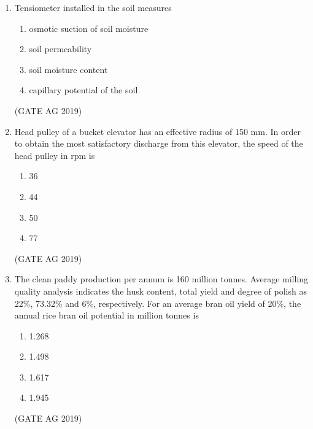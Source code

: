 \documentclass[journal,12pt,onecolumn]{IEEEtran}
\theoremstyle{remark}
\begin{document}
\begin{enumerate}
\begin{multicols}{4}
\begin{enumerate}
    \item 1-P, 2-R, 3-S, 4-Q
    \item 1-S, 2-P, 3-Q, 4-R
    \item 1-Q, 2-S, 3-P, 4-R
    \item 1-S, 2-Q, 3-P, 4-R
\end{enumerate}
\end{multicols}
\hfill{(GATE AG 2019)}


\item  Tensiometer installed in the soil measures

\begin{enumerate}
    \item osmotic suction of soil moisture
    \item soil permeability
    \item soil moisture content
    \item capillary potential of the soil
\end{enumerate}
\hfill{(GATE AG 2019)}



\item  Head pulley of a bucket elevator has an effective radius of 150 mm. In order to obtain the most satisfactory discharge from this elevator, the speed of the head pulley in rpm is
\begin{multicols}{4}
\begin{enumerate}
    \item 36
    \item 44
    \item 50
    \item 77
\end{enumerate}
\end{multicols}
\hfill{(GATE AG 2019)}


\item  The clean paddy production per annum is 160 million tonnes. Average milling quality analysis indicates the husk content, total yield and degree of polish as 22\%, 73.32\% and 6\%, respectively. For an average bran oil yield of 20\%, the annual rice bran oil potential in million tonnes is
\begin{multicols}{4}
\begin{enumerate}
    \item 1.268
    \item 1.498
    \item 1.617
    \item 1.945
\end{enumerate}
\end{multicols}
\hfill{(GATE AG 2019)}



\end{enumerate}
\end{document}
